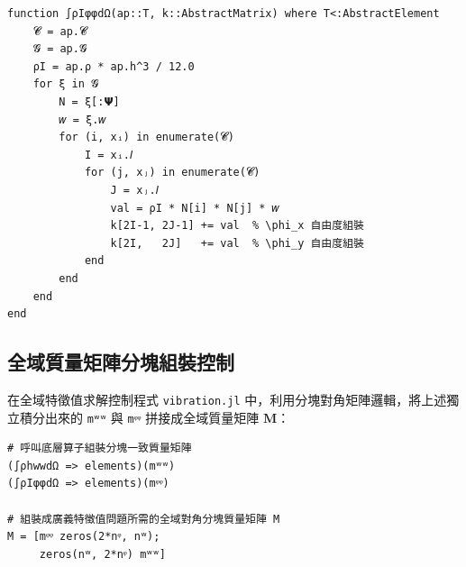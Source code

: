 \begin{lstlisting}[caption={thick\_plate.jl 中轉動慣量矩陣 \texttt{∫ρIφφdΩ} 實作}]
function ∫ρIφφdΩ(ap::T, k::AbstractMatrix) where T<:AbstractElement
    𝓒 = ap.𝓒
    𝓖 = ap.𝓖
    ρI = ap.ρ * ap.h^3 / 12.0
    for ξ in 𝓖
        N = ξ[:𝝭]
        𝑤 = ξ.𝑤
        for (i, xᵢ) in enumerate(𝓒)
            I = xᵢ.𝐼
            for (j, xⱼ) in enumerate(𝓒)
                J = xⱼ.𝐼
                val = ρI * N[i] * N[j] * 𝑤
                k[2I-1, 2J-1] += val  % \phi_x 自由度組裝
                k[2I,   2J]   += val  % \phi_y 自由度組裝
            end
        end
    end
end
\end{lstlisting}

\subsection{全域質量矩陣分塊組裝控制}
在全域特徵值求解控制程式 \texttt{vibration.jl} 中，利用分塊對角矩陣邏輯，將上述獨立積分出來的 \texttt{mʷʷ} 與 \texttt{mᵠᵠ} 拼接成全域質量矩陣 $\mathbf{M}$：

\begin{lstlisting}[caption={vibration.jl 中全域一致質量矩陣組裝控制片段}]
# 呼叫底層算子組裝分塊一致質量矩陣
(∫ρhwwdΩ => elements)(mʷʷ)
(∫ρIφφdΩ => elements)(mᵠᵠ)

# 組裝成廣義特徵值問題所需的全域對角分塊質量矩陣 M
M = [mᵠᵠ zeros(2*nᵠ, nʷ);
     zeros(nʷ, 2*nᵠ) mʷʷ]
\end{lstlisting}